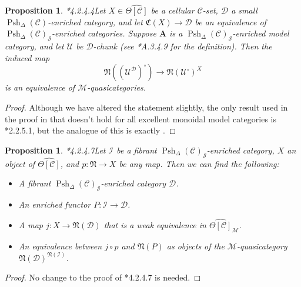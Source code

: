 \documentclass[leqno]{article}
\numberwithin{equation}{subsection}
\theoremstyle{plain}   %
\newtheorem{prop}[equation]{Proposition}
\theoremstyle{remark}
\theoremstyle{plain}
\providecommand{\C}{}
\renewcommand{\C}{\ensuremath{\mathcal{C}}}
\newcommand{\M}{\ensuremath{\mathcal{M}}}
\newcommand{\setS}{\ensuremath{\mathscr{S}}}
\newcommand{\cellset}{\ensuremath{\widehat{\Theta[\mathcal{C}]}}}
\newcommand{\spsh}{\ensuremath{\operatorname{Psh}_\Delta(\mathcal{C})}}
\begin{document}
\begin{prop}\cite{htt}*{4.2.4.4}\label{lurieprop1}
	Let \(X\in \cellset\) be a cellular \(\C\)-set, \(\mathcal{D}\) a small \(\spsh\)-enriched category, and let \(\mathfrak{C}(X)\to \mathcal{D}\) be an equivalence of \(\spsh_{\setS}\)-enriched categories. Suppose \(\mathbf{A}\) is a \(\spsh_{\setS}\)-enriched model category, and let \(\mathcal{U}\) be \(\mathcal{D}\)-chunk (see \cite{htt}*{A.3.4.9} for the definition).  Then the induced map
	\[\mathfrak{N}((\mathcal{U}^\mathcal{D})^\circ)\to \mathfrak{N}(\mathcal{U}^\circ)^X\] is an equivalence of \(\M\)-quasicategories.
\end{prop}
\begin{proof} Although we have altered the statement slightly, the only result used in the proof in \cite{htt} that doesn't hold for all excellent monoidal model categories is \cite{htt}*{2.2.5.1}, but the analogue of this is exactly .
\end{proof}
\begin{prop}\cite{htt}*{4.2.4.7}\label{lurieprop2}
	Let \(\mathcal{I}\) be a fibrant \(\spsh_{\setS}\)-enriched category, \(X\) an object of \(\cellset\), and \(p:\mathfrak{N}\to X\) be any map.  Then we can find the following:
	\begin{itemize}
		\item A fibrant \(\spsh_{\setS}\)-enriched category \(\mathcal{D}\).
		\item An enriched functor \(P:\mathcal{I}\to \mathcal{D}\).
		\item A map \(j:X\to \mathfrak{N}(\mathcal{D})\) that is a weak equivalence in \(\cellset_\mathcal{M}\).
		\item An equivalence between \(j\circ p\) and \(\mathfrak{N}(P)\) as objects of the \(\M\)-quasicategory \(\mathfrak{N}(\mathcal{D})^{\mathfrak{N}(\mathcal{I})}\).
	\end{itemize}
\end{prop}
\begin{proof} No change to the proof of \cite{htt}*{4.2.4.7} is needed.
\end{proof}
\end{document}

